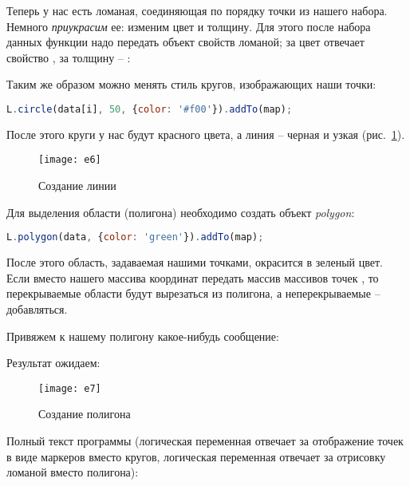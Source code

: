 Теперь у нас есть ломаная, соединяющая по порядку точки из нашего набора. 
Немного \emph{приукрасим} ее: изменим цвет и толщину. Для этого после набора 
данных  функции надо передать объект свойств ломаной; за цвет отвечает 
свойство , за толщину -- :


Таким же образом можно менять стиль кругов, изображающих наши точки:
\begin{lstlisting}[language=js]
    L.circle(data[i], 50, {color: '#f00'}).addTo(map);
\end{lstlisting}

После этого круги у нас будут красного цвета, а линия -- черная и узкая
(рис.~\ref{pic:e6}).
\begin{figure}[ht!]
    \center
    \texttt{[image: e6]}
    \caption{Создание линии}
    \label{pic:e6}
\end{figure}

Для выделения области (полигона) необходимо создать объект \emph{polygon}:
\begin{lstlisting}[language=js]
    L.polygon(data, {color: 'green'}).addTo(map);
\end{lstlisting}
После этого область, задаваемая нашими точками, окрасится в зеленый цвет.
Если вместо нашего массива координат  передать массив массивов
точек , то перекрываемые области будут
вырезаться из полигона, а неперекрываемые -- добавляться.

Привяжем к нашему полигону какое-нибудь сообщение:


Результат ожидаем:
\begin{figure}[ht!]
    \center
    \texttt{[image: e7]}
    \caption{Создание полигона}
    \label{pic:e7}
\end{figure}

Полный текст программы (логическая переменная  отвечает за 
отображение точек в виде маркеров вместо кругов, логическая переменная 
 отвечает за отрисовку ломаной вместо полигона):


\newpage

